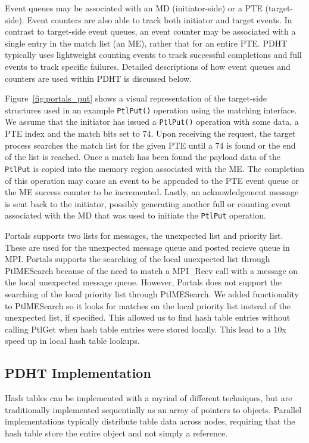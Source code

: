 Event queues may be associated with an MD (initiator-side) or a PTE
(target-side). Event counters are also able to track both initiator
and target events. In contrast to target-side event queues, an event
counter may be associated with a single entry in the match list (an ME), 
rather that for an entire PTE. PDHT typically uses lightweight counting
events to track successful completions and full events to track specific
failures. Detailed descriptions of how event queues and counters are used
within PDHT is discussed below.

Figure~\ref{fig:portals_put} shows a visual representation of the target-side
structures used in an example {\tt PtlPut()} operation using the matching
interface. We assume that the initiator has issued a {\tt PtlPut()} operation
with some data, a PTE index and the match bits set to 74. Upon receiving the
request, the target process searches the match list for the given PTE until a
74 is found or the end of the list is reached. Once a match has been found the
payload data of the {\tt PtlPut} is copied into the memory region associated
with the ME. The completion of this operation may cause an event to be appended
to the PTE event queue or the ME success counter to be incremented. 
Lastly, an acknowledgement message is sent back to the initiator, possibly
generating another full or counting event associated with the MD that
was used to initiate the {\tt PtlPut} operation.

Portals supports two lists for messages, the unexpected list and priority list. 
These are used for the unexpected message queue and posted recieve queue in MPI. Portals supports the 
searching of the local unexpected list through PtlMESearch because of the need to match a MPI\_Recv
call with a message on the local unexpected message queue. However, Portals does not support the searching of 
the local priority list through PtlMESearch. We added functionality to PtlMESearch so it looks for matches
on the local priority list instead of the unexpected list, if specified. This allowed us to find hash table entries without 
calling PtlGet when hash table entries were stored locally. This lead to a 10x speed up in local hash table 
lookups.


\subsection{PDHT Implementation}

Hash tables can be implemented with a myriad of different techniques, but are
traditionally implemented sequentially as an array of pointers to objects.
Parallel implementations typically distribute table data across nodes,
requiring that the hash table store the entire object and not simply a
reference. 

